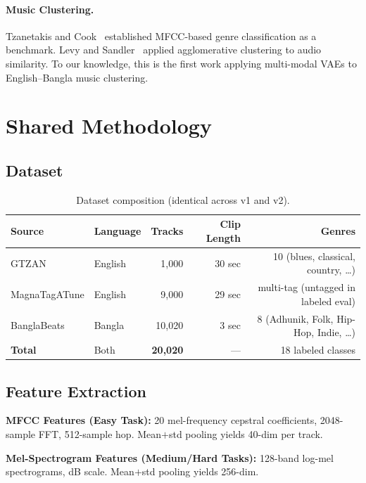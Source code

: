 \documentclass{article}
\begin{document}
\paragraph{Music Clustering.}
Tzanetakis and Cook~\cite{tzanetakis2002musical} established MFCC-based genre
classification as a benchmark. Levy and Sandler~\cite{levy2006music} applied
agglomerative clustering to audio similarity. To our knowledge, this is the first work
applying multi-modal VAEs to English--Bangla music clustering.

\section{Shared Methodology}
\label{sec:method}

\subsection{Dataset}

\begin{table}[H]
\centering
\caption{Dataset composition (identical across v1 and v2).}
\label{tab:dataset}
\small
\begin{tabular}{llrrr}
\toprule
\textbf{Source} & \textbf{Language} & \textbf{Tracks} & \textbf{Clip Length} & \textbf{Genres} \\
\midrule
GTZAN & English & 1,000 & 30 sec & 10 (blues, classical, country, \ldots) \\
MagnaTagATune & English & 9,000 & 29 sec & multi-tag (untagged in labeled eval) \\
BanglaBeats & Bangla & 10,020 & 3 sec & 8 (Adhunik, Folk, Hip-Hop, Indie, \ldots) \\
\midrule
\textbf{Total} & Both & \textbf{20,020} & --- & 18 labeled classes \\
\bottomrule
\end{tabular}
\end{table}

\subsection{Feature Extraction}

\textbf{MFCC Features (Easy Task):} 20 mel-frequency cepstral coefficients, 2048-sample FFT,
512-sample hop. Mean$+$std pooling yields 40-dim per track.

\textbf{Mel-Spectrogram Features (Medium/Hard Tasks):} 128-band log-mel spectrograms,
dB scale. Mean$+$std pooling yields 256-dim.
\end{document}
